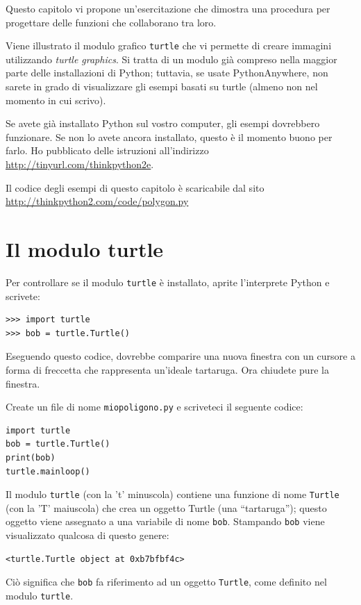 \documentclass[10pt]{book}
\begin{document}
Questo capitolo vi propone un'esercitazione che dimostra una procedura per progettare delle funzioni che collaborano tra loro.

Viene illustrato il modulo grafico {\tt turtle} che vi permette di creare immagini utilizzando {\em turtle graphics}.  Si tratta di un modulo già compreso nella maggior parte delle installazioni di Python; tuttavia, se usate PythonAnywhere, non sarete in grado di visualizzare gli esempi basati su turtle (almeno non nel momento in cui scrivo).

Se avete già installato Python sul vostro computer, gli esempi dovrebbero funzionare. Se non lo avete ancora installato, questo è il momento buono per farlo. Ho pubblicato delle istruzioni all'indirizzo \url{http://tinyurl.com/thinkpython2e}.

Il codice degli esempi di questo capitolo è scaricabile dal sito
\url{http://thinkpython2.com/code/polygon.py}


\section{Il modulo turtle}
\label{turtle}

Per controllare se il modulo {\tt turtle} è installato, aprite l'interprete Python e scrivete:

\begin{verbatim}
>>> import turtle
>>> bob = turtle.Turtle()
\end{verbatim}

Eseguendo questo codice, dovrebbe comparire una nuova finestra con un cursore a forma di freccetta che rappresenta un'ideale tartaruga. Ora chiudete pure la finestra.

Create un file di nome {\tt miopoligono.py} e scriveteci il seguente codice:

\begin{verbatim}
import turtle
bob = turtle.Turtle()
print(bob)
turtle.mainloop()
\end{verbatim}
%
Il modulo {\tt turtle} (con la 't' minuscola) contiene una funzione di nome {\tt Turtle} (con la 'T' maiuscola) che crea un oggetto Turtle (una ``tartaruga''); questo oggetto viene assegnato a una variabile di nome {\tt bob}.
Stampando {\tt bob} viene visualizzato qualcosa di questo genere:

\begin{verbatim}
<turtle.Turtle object at 0xb7bfbf4c>
\end{verbatim}
%
Ciò significa che {\tt bob} fa riferimento ad un oggetto {\tt Turtle},
come definito nel modulo {\tt turtle}.
\end{document}
